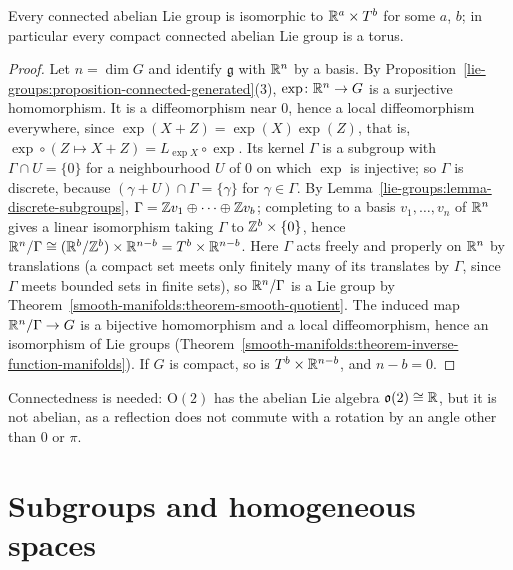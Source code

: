 \begin{theorem}\label{lie-groups:theorem-abelian}
Every connected abelian Lie group is isomorphic to $\mathbb{R}^a \times T^b$ for some $a$, $b$; in particular every compact connected abelian Lie group is a torus.
\end{theorem}

\begin{proof}
Let $n = \dim G$ and identify $\mathfrak{g}$ with $\mathbb{R}^n$ by a basis. By Proposition~\ref{lie-groups:proposition-connected-generated}(3),
$\exp \colon \mathbb{R}^n \to G$ is a surjective homomorphism. It is a diffeomorphism near $0$, hence a local diffeomorphism everywhere, since
$\exp(X + Z) = \exp(X)\exp(Z)$, that is, $\exp \circ (Z \mapsto X + Z) = L_{\exp X} \circ \exp$. Its kernel $\Gamma$ is a subgroup with $\Gamma \cap U = \{0\}$
for a neighbourhood $U$ of $0$ on which $\exp$ is injective; so $\Gamma$ is discrete, because $(\gamma + U) \cap \Gamma = \{\gamma\}$ for $\gamma \in \Gamma$. By
Lemma~\ref{lie-groups:lemma-discrete-subgroups}, $\Gamma = \mathbb{Z} v_1 \oplus \cdots \oplus \mathbb{Z} v_b$; completing to a basis $v_1, \ldots, v_n$ of $\mathbb{R}^n$ gives a
linear isomorphism taking $\Gamma$ to $\mathbb{Z}^b \times \{0\}$, hence $\mathbb{R}^n/\Gamma \cong (\mathbb{R}^b/\mathbb{Z}^b) \times \mathbb{R}^{n-b} = T^b \times \mathbb{R}^{n-b}$. Here $\Gamma$ acts
freely and properly on $\mathbb{R}^n$ by translations (a compact set meets only finitely many of its translates by $\Gamma$, since $\Gamma$ meets bounded sets in finite
sets), so $\mathbb{R}^n/\Gamma$ is a Lie group by Theorem~\ref{smooth-manifolds:theorem-smooth-quotient}. The induced map $\mathbb{R}^n/\Gamma \to G$ is a bijective
homomorphism and a local diffeomorphism, hence an isomorphism of Lie groups (Theorem~\ref{smooth-manifolds:theorem-inverse-function-manifolds}). If $G$ is
compact, so is $T^b \times \mathbb{R}^{n-b}$, and $n - b = 0$.
\end{proof}

\begin{counterexample}\label{lie-groups:counterexample-abelian-algebra}
Connectedness is needed: $\mathrm{O}(2)$ has the abelian Lie algebra $\mathfrak{o}(2) \cong \mathbb{R}$, but it is not abelian, as a reflection does not commute with a rotation by an angle other than $0$ or $\pi$.
\end{counterexample}

\section{Subgroups and homogeneous spaces}\label{lie-groups:section-homogeneous}

